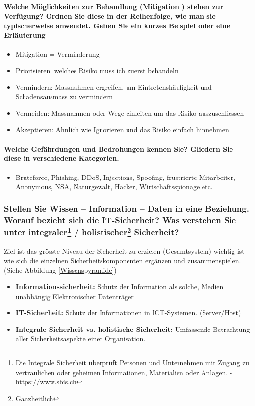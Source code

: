 \documentclass[10pt,a4paper]{article}
\begin{document}
\paragraph*{Welche Möglichkeiten zur Behandlung (\flqq Mitigation \frqq) stehen zur Verfügung? Ordnen Sie diese in der Reihenfolge, wie man sie typischerweise anwendet. Geben Sie ein kurzes Beispiel oder eine Erläuterung}
\begin{itemize}[noitemsep,topsep=0pt,leftmargin=*]
    \item Mitigation = Verminderung
    \item Priorisieren: welches Risiko muss ich zuerst behandeln
    \item Vermindern: Massnahmen ergreifen, um Eintretenshäufigkeit und Schadensausmass zu vermindern
    \item Vermeiden: Massnahmen oder Wege einleiten um das Risiko auszuschliessen
    \item Akzeptieren: Ähnlich wie Ignorieren und das Risiko einfach hinnehmen
\end{itemize}

\paragraph*{Welche Gefährdungen und Bedrohungen kennen Sie? Gliedern Sie diese in verschiedene Kategorien.}
\begin{itemize}[noitemsep,topsep=0pt,leftmargin=*]
    \item Bruteforce, Phishing, DDoS, Injections, Spoofing, frustrierte Mitarbeiter, Anonymous, NSA, Naturgewalt, Hacker, Wirtschaftsspionage etc.
\end{itemize}

\subsubsection*{Stellen Sie Wissen – Information – Daten in eine Beziehung. Worauf bezieht sich die IT-Sicherheit? Was verstehen Sie unter integraler\footnote{Die Integrale Sicherheit überprüft Personen und Unternehmen mit Zugang zu vertraulichen oder geheimen Informationen, Materialien oder Anlagen. - https://www.sbis.ch} / holistischer\footnote{Ganzheitlich} Sicherheit?}
Ziel ist das grösste Niveau der Sicherheit zu erzielen (Gesamtsystem) wichtig ist wie sich die einzelnen Sicherheitskomponenten ergänzen und zusammenspielen. (Siehe Abbildung \ref{Wissenspyramide})
\begin{itemize}[noitemsep,topsep=0pt,leftmargin=*]
    \item \textbf{Informationssicherheit:} Schutz der Information als solche, Medien unabhängig Elektronischer Datenträger
    \item \textbf{IT-Sicherheit:} Schutz der Informationen in ICT-Systemen. (Server/Host)
    \item \textbf{Integrale Sicherheit vs. holistische Sicherheit:} Umfassende Betrachtung aller Sicherheitsaspekte einer Organisation.
\end{itemize}
\end{document}
